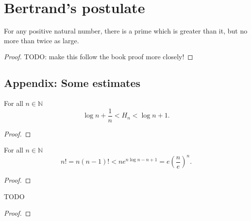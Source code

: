 \chapter{Bertrand's postulate}

\begin{theorem}
    \label{thm:bertrands_postulate}
    \leanok
    For any positive natural number, there is a prime which is greater than
    it, but no more than twice as large.
\end{theorem}
\begin{proof}
    \leanok
    TODO: make this follow the book proof more closely!
\end{proof}

\section{Appendix: Some estimates}

\begin{theorem}
    \label{thm:estimate_integral}
    \leanok
    For all \(n \in \mathbb{N}\)
    \[
    \log n + \frac 1 n < H_n < \log n + 1.
    \]
\end{theorem}
\begin{proof}
\end{proof}


\begin{theorem}
    \label{thm:estimate_factorials}
    \leanok
    For all \(n \in \mathbb{N}\)
    \[
    n! = n(n -1)! < ne^{n \log n - n + 1}= e\left(\frac n e\right)^n.
    \]
\end{theorem}
\begin{proof}
\end{proof}

\begin{theorem}
    \label{thm:estimate_binomial_coefficient}
    TODO
\end{theorem}
\begin{proof}
\end{proof}
